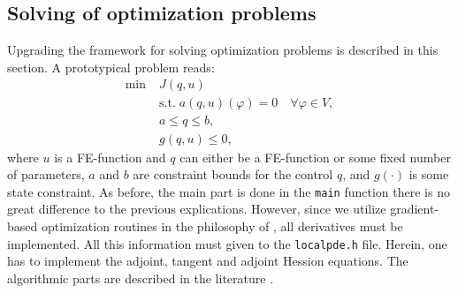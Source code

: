 \documentclass[prodmode,acmtoms]{acmsmall}
\numberwithin{equation}{section}
\renewcommand{\phi}{\varphi}
\begin{document}
\subsection{Solving of optimization problems}\label{sec:opt}
Upgrading the framework for solving optimization problems
is described in this section. A prototypical problem reads:
\begin{align*}
\min\;&J(q,u) \\
  &\text{s.t.}\; a(q,u)(\phi) = 0 \quad \forall \phi\in V,\\
  &a \le q \le b,\\
  &g(q,u) \le 0,  
\end{align*}
where $u$ is a FE-function and $q$ can either be a FE-function or some 
fixed number of parameters, $a$ and $b$ are constraint bounds for the control $q$,
and $g(\cdot)$ is some state constraint.
As before, the main part is done in the \texttt{main} function there is no
great difference to the previous explications. However, 
since we utilize gradient-based optimization routines in the philosophy of
\cite{Troe99,HiKu01},
all derivatives must be implemented. All this information
must given to the \texttt{localpde.h} file. Herein, one has to 
implement the adjoint, tangent and adjoint Hession equations. 
The algorithmic parts are described in the literature \cite{BeMeVe06}.
\end{document}
